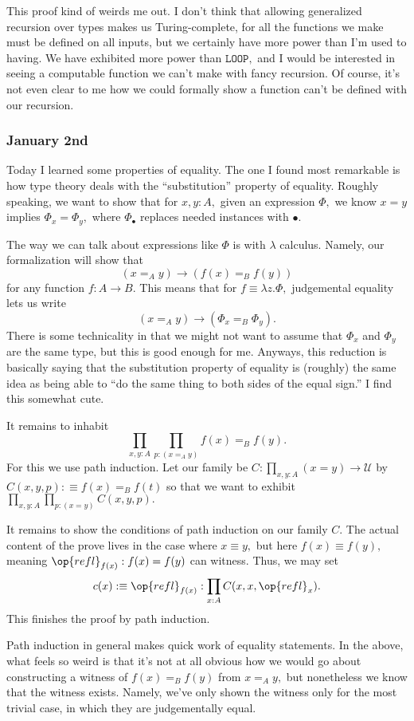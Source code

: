 This proof kind of weirds me out. I don't think that allowing generalized recursion over types makes us Turing-complete, for all the functions we make must be defined on all inputs, but we certainly have more power than I'm used to having. We have exhibited more power than $\texttt{LOOP},$ and I would be interested in seeing a computable function we can't make with fancy recursion. Of course, it's not even clear to me how we could formally show a function can't be defined with our recursion.

\subsubsection{January 2nd}
Today I learned some properties of equality. The one I found most remarkable is how type theory deals with the ``substitution'' property of equality. Roughly speaking, we want to show that for $x,y:A,$ given an expression $\Phi,$ we know $x=y$ implies $\Phi_x=\Phi_y,$ where $\Phi_\bullet$ replaces needed instances with $\bullet.$

The way we can talk about expressions like $\Phi$ is with $\lambda$ calculus. Namely, our formalization will show that
\[(x=_Ay)\to(f(x)=_Bf(y))\]
for any function $f:A\to B.$ This means that for $f\equiv\lambda z.\Phi,$ judgemental equality lets us write
\[(x=_Ay)\to(\Phi_x=_B\Phi_y).\]
There is some technicality in that we might not want to assume that $\Phi_x$ and $\Phi_y$ are the same type, but this is good enough for me. Anyways, this reduction is basically saying that the substitution property of equality is (roughly) the same idea as being able to ``do the same thing to both sides of the equal sign.'' I find this somewhat cute.

It remains to inhabit
\[\prod_{x,y:A}\prod_{p:(x=_Ay)}f(x)=_Bf(y).\]
For this we use path induction. Let our family be $C:\prod_{x,y:A}(x=y)\to\mathcal U$ by $C(x,y,p):\equiv f(x)=_Bf(t)$ so that we want to exhibit $\prod_{x,y:A}\prod_{p:(x=y)}C(x,y,p).$

It remains to show the conditions of path induction on our family $C.$ The actual content of the prove lives in the case where $x\equiv y,$ but here $f(x)\equiv f(y),$ meaning $\op{refl}_{f(x)}:f(x)=f(y)$ can witness. Thus, we may set
\[c(x):\equiv\op{refl}_{f(x)}:\prod_{x:A}C(x,x,\op{refl}_x).\]
This finishes the proof by path induction.

Path induction in general makes quick work of equality statements. In the above, what feels so weird is that it's not at all obvious how we would go about constructing a witness of $f(x)=_Bf(y)$ from $x=_Ay,$ but nonetheless we know that the witness exists. Namely, we've only shown the witness only for the most trivial case, in which they are judgementally equal.

